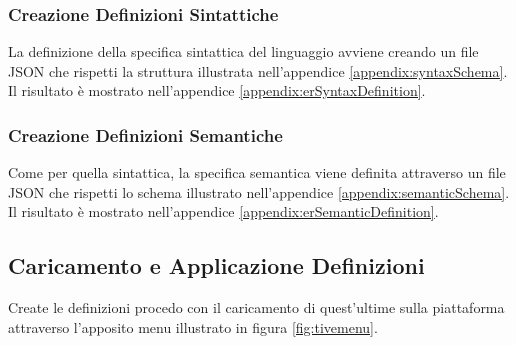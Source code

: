            \subsubsection{Creazione Definizioni Sintattiche}
                La definizione della specifica sintattica del linguaggio avviene creando un file JSON che rispetti la struttura illustrata nell'appendice \ref{appendix:syntaxSchema}. Il risultato è mostrato nell'appendice \ref{appendix:erSyntaxDefinition}.

            \subsubsection{Creazione Definizioni Semantiche}
                Come per quella sintattica, la specifica semantica viene definita attraverso un file JSON che rispetti lo schema illustrato nell'appendice \ref{appendix:semanticSchema}. Il risultato è mostrato nell'appendice \ref{appendix:erSemanticDefinition}.

        \subsection{Caricamento e Applicazione Definizioni}
            Create le definizioni procedo con il caricamento di quest'ultime sulla piattaforma attraverso l'apposito menu illustrato in figura \ref{fig:tivemenu}.


